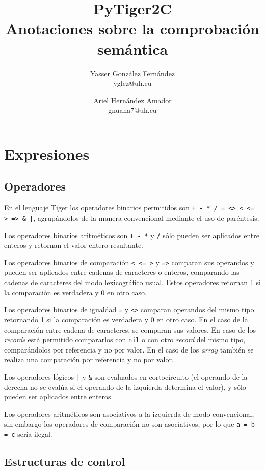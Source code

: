\documentclass{article}
\title{
	\LARGE{PyTiger2C} \\
	\Large{Anotaciones sobre la comprobación semántica}
}
\author{
  	Yasser González Fernández \\
  	\small{yglez@uh.cu}
  	\and
  	Ariel Hernández Amador \\
  	\small{gnuaha7@uh.cu}
}
\date{}
\begin{document}
\maketitle

\thispagestyle{empty}

\newpage

\setcounter{page}{1}

\section{Expresiones}

\subsection{Operadores}

En el lenguaje Tiger los operadores binarios permitidos son
\verb$+ - * / = <> < <= > => & |$, agrupándolos de la manera convencional
mediante el uso de paréntesis.

Los operadores binarios aritméticos son \verb|+ - *| y \verb|/| sólo pueden
ser aplicados entre enteros y retornan el valor entero resultante.

Los operadores binarios de comparación \verb|< <= >| y \verb|=>| comparan sus
operandos y pueden ser aplicados entre cadenas de caracteres o enteros, comparando
las cadenas de caracteres del modo lexicográfico usual. Estos operadores retornan
1 si la comparación es verdadera y 0 en otro caso.

Los operadores binarios de igualdad \verb|=| y \verb|<>| comparan operandos del
mismo tipo retornando 1 si la comparación es verdadera y 0 en otro caso. En el
caso de la comparación entre cadena de caracteres, se comparan sus valores. En
caso de los \emph{records} está permitido compararlos con \verb|nil| o con otro
\emph{record} del mismo tipo, comparándolos por referencia y no por valor. En el
caso de los \emph{array} también se realiza una comparación por referencia y no
por valor.

Los operadores lógicos \verb$|$ y \verb$&$ son evaluados en cortocircuito (el
operando de la derecha no se evalúa si el operando de la izquierda determina
el valor), y sólo pueden ser aplicados entre enteros.

Los operadores aritméticos son asociativos a la izquierda de modo convencional,
sin embargo los operadores de comparación no son asociativos, por lo que
\verb|a = b = c| sería ilegal.

\subsection{Estructuras de control}
\end{document}

